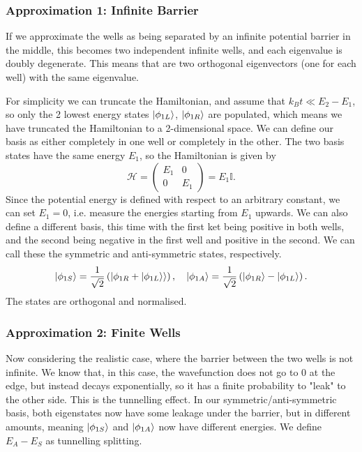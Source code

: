 \documentclass{article}
\begin{document}
\subsubsection{Approximation 1: Infinite Barrier}
If we approximate the wells as being separated by an infinite potential barrier in the middle, this becomes two independent infinite wells, and each eigenvalue is doubly degenerate. This means that are two orthogonal eigenvectors (one for each well) with the same eigenvalue.

For simplicity we can truncate the Hamiltonian, and assume that $k_Bt\ll E_2-E_1$, so only the 2 lowest energy states $\ket{\phi _{1L}}$, $\ket{\phi _{1R}}$ are populated, which means we have truncated the Hamiltonian to a 2-dimensional space. We can define our basis as either completely in one well or completely in the other. The two basis states have the same energy $E_1$, so the Hamiltonian is given by
\[
    \mathcal{H}=\begin{pmatrix}
        E_1 & 0 \\ 0 & E_1
    \end{pmatrix}=E_1 \mathbb{I}.
\]
Since the potential energy is defined with respect to an arbitrary constant, we can set $E_1=0$, i.e. measure the energies starting from $E_1$ upwards. We can also define a different basis, this time with the first ket being positive in both wells, and the second being negative in the first well and positive in the second. We can call these the symmetric and anti-symmetric states, respectively.
\[
    \ket{\phi _{1S}}=\frac{1}{\sqrt{2}}\left( \ket{\phi _{1R}+\ket{\phi _{1L}}} \right),\quad \ket{\phi _{1A}}=\frac{1}{\sqrt{2}}\left( \ket{\phi _{1R}}-\ket{\phi _{1L}} \right).
\]
The states are orthogonal and normalised.

\subsubsection{Approximation 2: Finite Wells}
Now considering the realistic case, where the barrier between the two wells is not infinite. We know that, in this case, the wavefunction does not go to 0 at the edge, but instead decays exponentially, so it has a finite probability to "leak" to the other side. This is the tunnelling effect. In our symmetric/anti-symmetric basis, both eigenstates now have some leakage under the barrier, but in different amounts, meaning $\ket{\phi _{1S}}$ and $\ket{\phi _{1A}}$ now have different energies. We define $E_A-E_S$ as tunnelling splitting.
\end{document}

